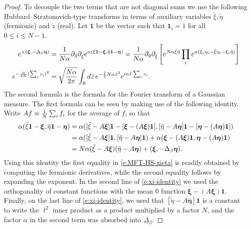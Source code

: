 \documentclass[11pt]{amsart}
\numberwithin{equation}{section}
\numberwithin{theorem}{section}
\newcommand{\V}[1]{\boldsymbol{#1}}
\begin{document}
\begin{proof}
To decouple the two terms that are not diagonal sums we use the following
Hubbard--Stratonovich-type transforms 
in terms of auxiliary variables $\tilde\xi,\tilde\eta$ (fermionic) and
$\tilde z$ (real). Let $\mathbf{1}$ be the vector such that
$\mathbf{1}_i=1$ for all $0\leq i\leq N-1$.
\begin{align}
  \label{e:MFT-HS-xieta}
  e^{+(\V{\xi},-\Delta_\beta\V{\eta})}
  &=
    \frac{1}{N\alpha}
  \partial_{\tilde\eta} \partial_{\tilde\xi} e^{\alpha(\tilde \xi
    \mathbf{1} -\V{\xi},\tilde\eta \mathbf{1}-\V{\eta})} 
    =
        \frac{1}{N\alpha}
  \partial_{\tilde\eta} \partial_{\tilde\xi} \qa{
    e^{N\alpha\tilde\xi\tilde \eta} \prod_i e^{\alpha
    (\xi_i\eta_i-\tilde\xi\eta_i-\xi_i\tilde\eta)} } 
  \\
    \label{e:MFT-HS-z}
  e^{-\frac{\alpha}{2N} (\sum_i z_i)^2}
  &
  =
  \sqrt{\frac{N\alpha}{2\pi}} \int_\R d\tilde z \, e^{-\frac12 N\alpha \tilde z^2} e^{i\alpha \tilde z \sum_i z_i}.
\end{align}
The second formula is the formula for the Fourier transform of a Gaussian measure.
The first formula can be seen by making use of the following
identity. Write $Af \equiv \frac{1}{N}\sum_i f_i$
for the average of $f$, so that 
\begin{align} \label{e:xi-identity}
  \alpha(\tilde \xi \mathbf{1} -\V{\xi},\tilde\eta \mathbf{1}-\V{\eta})
  &=
    \alpha([\tilde \xi   -A\V{\xi}]\mathbf{1}-[\V{\xi}-(A\V{\xi}) \mathbf{1}],[\tilde\eta -A\V{\eta}]\mathbf{1}-[\V{\eta}-(A\V{\eta})\mathbf{1}])
    \nnb
  &=
    \alpha([\tilde \xi -A\V{\xi}]\mathbf{1},[\tilde\eta -A\V{\eta}]\mathbf{1})+\alpha(\V{\xi}-(A\V{\xi})\mathbf{1},\V{\eta}-(A\V{\eta})\mathbf{1})
    \nnb
  &=
    N\alpha(\tilde \xi -A\V{\xi})(\tilde\eta -A\V{\eta})+(\V{\xi},-\Delta_\beta\V{\eta}).
\end{align}
Using this identity the first equality in \eqref{e:MFT-HS-xieta} is
readily obtained by computing the fermionic derivatives, while the second equality follows by expanding the exponent. In 
the second line of \eqref{e:xi-identity} we used the orthogonality of constant functions with
the mean $0$ function $\V{\xi}-(A\V{\xi})\mathbf{1}$.  Finally, on the last line of
\eqref{e:xi-identity}, we used that $[\tilde \eta-A\V{\eta}]\mathbf{1}$ is a constant
to write the $\ell^2$ inner product as a product multiplied by a
factor $N$, and the factor $\alpha$ in the second term was absorbed into
$\Delta_{\beta}$.


\end{proof}
\end{document}
